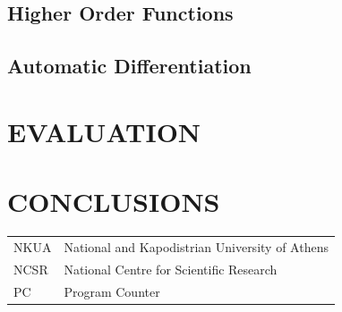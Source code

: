 \documentclass[ack,preface]{dithesis}
\begin{document}
   \section{Higher Order Functions}

 \cite{RondogiannisW99}

    \section{Automatic Differentiation}

\chapter{EVALUATION}

\chapter{CONCLUSIONS}

\backmatter

\abbreviations
\begin{center}
	\renewcommand{\arraystretch}{1.5}
	\begin{longtable}{ l @{\qquad} l }
	\toprule
	NKUA    & National and Kapodistrian University of Athens\\
	NCSR & National Centre for Scientific Research \\
	PC & Program Counter \\
	\bottomrule
	\end{longtable}
\end{center}







\end{document}
